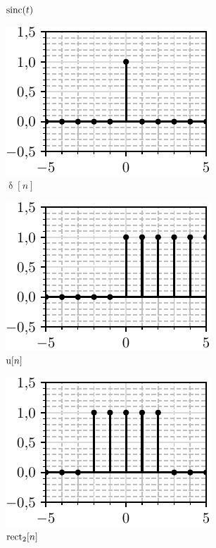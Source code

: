 \begin{figure}[ht!]
\begin{subfigure}[c]{0.3\textwidth}
        \caption{$\operatorname{sinc}(t)$}
    \end{subfigure}
    \hspace*{0pt}\hfill
    \begin{subfigure}[c]{0.3\textwidth}
        \centering
        \includegraphics[scale=1]{fig/delta_dt_plot.pdf}
        \caption{$\updelta[n]$}
    \end{subfigure}
    \hfill
    \begin{subfigure}[c]{0.3\textwidth}
        \centering
        \includegraphics[scale=1]{fig/u_dt_plot.pdf}
        \caption{${\rm u}[n]$}
    \end{subfigure}
    \hfill
    \begin{subfigure}[c]{0.3\textwidth}
        \centering
        \includegraphics[scale=1]{fig/rect_dt_plot.pdf}
        \caption{$\operatorname{rect}_2[n]$}
    \end{subfigure}
    \hfill
    \hspace*{0pt}
    \caption{}
\end{figure}
\vspace*{-10mm}